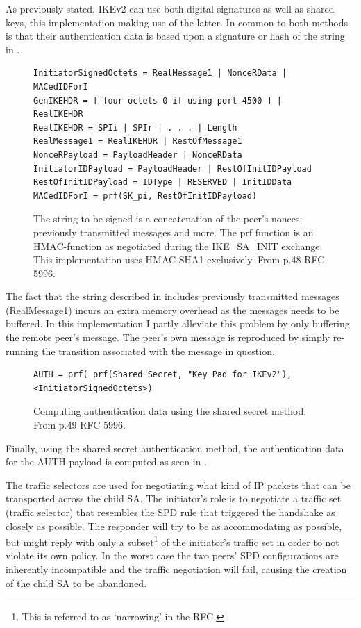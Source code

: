 \documentclass[final,a4paper,twoside,11pt,onecolumn]{report}
\begin{document}
As previously stated, IKEv2 can use both digital signatures as well as shared keys, this implementation making use of the latter. In common to both methods is that their authentication data is based upon a signature or hash of the string in .

\begin{figure}[h]
\begin{verbatim}
InitiatorSignedOctets = RealMessage1 | NonceRData | MACedIDForI
GenIKEHDR = [ four octets 0 if using port 4500 ] | RealIKEHDR 
RealIKEHDR = SPIi | SPIr | . . . | Length 
RealMessage1 = RealIKEHDR | RestOfMessage1
NonceRPayload = PayloadHeader | NonceRData
InitiatorIDPayload = PayloadHeader | RestOfInitIDPayload 
RestOfInitIDPayload = IDType | RESERVED | InitIDData 
MACedIDForI = prf(SK_pi, RestOfInitIDPayload)
\end{verbatim}
\label{fig:sign-string}
\caption{The string to be signed is a concatenation of the peer's nonces; previously transmitted messages and more. The prf function is an HMAC-function as negotiated during the IKE\_SA\_INIT exchange. This implementation uses HMAC-SHA1 exclusively. From p.48 RFC 5996.}
\end{figure}

The fact that the string described in  includes previously transmitted messages (RealMessage1) incurs an extra memory overhead as the messages needs to be buffered. In this implementation I partly alleviate this problem by only buffering the remote peer's message. The peer's own message is reproduced by simply re-running the transition associated with the message in question.

\begin{figure}[h]
\begin{verbatim}
AUTH = prf( prf(Shared Secret, "Key Pad for IKEv2"),
<InitiatorSignedOctets>)
\end{verbatim}
\label{fig:final-sign}
\caption{Computing authentication data using the shared secret method. From p.49 RFC 5996.}
\end{figure}

Finally, using the shared secret authentication method, the authentication data for the AUTH payload is computed as seen in .

The traffic selectors are used for negotiating what kind of IP packets that can be transported across the child SA. The initiator's role is to negotiate a traffic set (traffic selector) that resembles the SPD rule that triggered the handshake as closely as possible. The responder will try to be as accommodating as possible, but might reply with only a subset\footnote{This is referred to as `narrowing' in the RFC.} of the initiator's traffic set in order to not violate its own policy. In the worst case the two peers' SPD configurations are inherently incompatible and the traffic negotiation will fail, causing the creation of the child SA to be abandoned.
\end{document}
